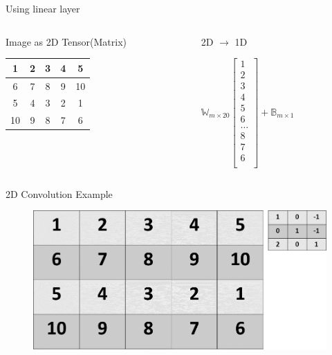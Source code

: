 \begin{frame}{Using linear layer}
\begin{columns}
	\begin{column}{.7\textwidth}
		\begin{block}{Image as 2D Tensor(Matrix)}
			\begin{center}
			\begin{tabular}{|c|c|c|c|c|}
				\hline
				1 & 2 & 3 & 4 & 5 \\
				\hline
				6 & 7 & 8 & 9 & 10 \\
				\hline
				5 & 4 & 3 & 2 & 1 \\
				\hline
				10 & 9 & 8& 7 & 6 \\
				\hline
			\end{tabular}
			\end{center}
		\end{block}
	\end{column}
	\begin{column}{.3\textwidth}
		\begin{block}{2D $\rightarrow$ 1D}
			\begin{tiny}
				\begin{math}
				\mathbb{W}_{m \times 20} 
				\begin{bmatrix}
				1 \\ 2 \\ 3 \\ 4 \\ 5 \\ 6 \\
				\dots \\
				8 \\ 7\\ 6 \\
				\end{bmatrix} 
				+ \mathbb{B}_{m\times 1}
				\end{math}			
			\end{tiny}
		\end{block}
	\end{column}
\end{columns}
\end{frame}

\begin{frame}{2D Convolution Example}
	\begin{figure}
		\includegraphics[width=.7\textwidth, center]{figures/conv-slide1-cropped}
	\end{figure}
\end{frame}

